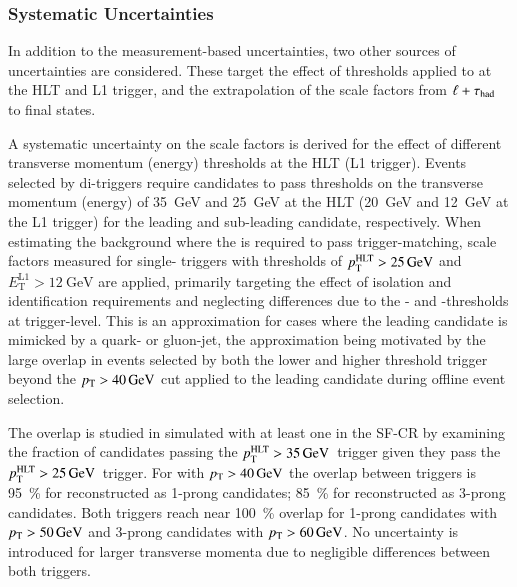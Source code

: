 \subsubsection{Systematic Uncertainties}


In addition to the measurement-based uncertainties, two other sources
of uncertainties are considered. These target the effect of thresholds
applied to \tauhadvis at the HLT and L1 trigger, and the extrapolation
of the scale factors from $\ell + \tau_{\text{had}}$ to \hadhad final states.

A systematic uncertainty on the scale factors is derived for the
effect of different \tauhadvis transverse momentum (energy) thresholds
at the HLT (L1 trigger). Events selected by di-\tauhadvis triggers
require \tauhadvis candidates to pass thresholds on the transverse
momentum (energy) of \SI{35}{\GeV} and \SI{25}{\GeV} at the HLT
(\SI{20}{\GeV} and \SI{12}{\GeV} at the L1 trigger) for the leading
and sub-leading \tauhadvis candidate, respectively. When estimating
the \ttbarFakes background where the \faketauhadvis is required to
pass trigger-matching, scale factors measured for single-\tauhadvis
triggers with thresholds of $p_{\text{T}}^{\text{HLT}} > \SI{25}{\ensuremath{\text{GeV}}}$ and
$E_{\text{T}}^{\text{L1}} > \SI{12}{\GeV}$ are applied, primarily
targeting the effect of isolation and identification requirements and
neglecting differences due to the \pT- and \ET-thresholds at
trigger-level. This is an approximation for cases where the leading
\tauhadvis candidate is mimicked by a quark- or gluon-jet, the
approximation being motivated by the large overlap in events selected
by both the lower and higher threshold trigger beyond the
$\pT > \SI{40}{\GeV}$ cut applied to the leading \tauhadvis candidate
during offline event selection.

The overlap is studied in simulated \ttbar with at least one
\faketauhadvis in the SF-CR by examining the fraction of \tauhadvis
candidates passing the $p_{\text{T}}^{\text{HLT}} > \SI{35}{\ensuremath{\text{GeV}}}$~trigger given they
pass the $p_{\text{T}}^{\text{HLT}} > \SI{25}{\ensuremath{\text{GeV}}}$~trigger. For \faketauhadvis with
$\pT > \SI{40}{\GeV}$ the overlap between triggers is
\SI{95}{\percent} for \faketauhadvis reconstructed as 1-prong
candidates; \SI{85}{\percent} for \faketauhadvis reconstructed as
3-prong candidates. %
Both triggers reach near \SI{100}{\percent} overlap for 1-prong
candidates with $p_{\text{T}} > \SI{50}{\ensuremath{\text{GeV}}}$ and 3-prong candidates with
$p_{\text{T}} > \SI{60}{\ensuremath{\text{GeV}}}$. No uncertainty is introduced for
larger transverse momenta due to negligible differences between both
triggers.

